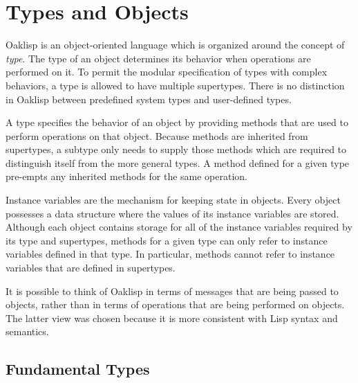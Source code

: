 %
%
%


\chapter{Types and Objects} \label{types}


Oaklisp is an object-oriented language which is organized around the
concept of \emph{type}.  The type of an object determines its behavior
when operations are performed on it.  To permit the modular
specification of types with complex behaviors, a type is allowed to
have multiple supertypes.  There is no distinction in Oaklisp between
predefined system types and user-defined types.

A type specifies the behavior of an object by providing methods that
are used to perform operations on that object.  Because methods are
inherited from supertypes, a subtype only needs to supply those
methods which are required to distinguish itself from the more general
types.  A method defined for a given type pre-empts any inherited
methods for the same operation.

Instance variables are the mechanism for keeping state in objects.
Every object possesses a data structure where the values of its
instance variables are stored.  Although each object contains storage
for all of the instance variables required by its type and supertypes,
methods for a given type can only refer to instance variables defined
in that type.  In particular, methods cannot refer to instance
variables that are defined in supertypes.

It is possible to think of Oaklisp in terms of messages that are being
passed to objects, rather than in terms of operations that are being
performed on objects.  The latter view was chosen because it is more
consistent with Lisp syntax and semantics.

\section{Fundamental Types}

